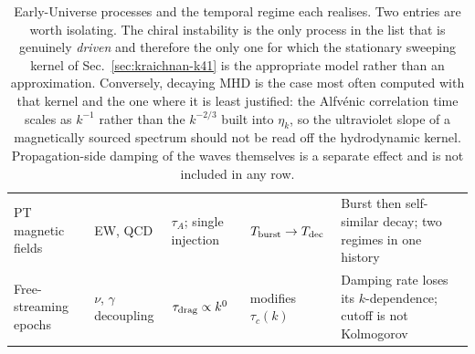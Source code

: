\documentclass[10pt,prd,aps,nobibnotes,superscriptaddress,preprintnumbers,notitlepage]{revtex4-1}
\begin{document}
\begin{table}[ht]
\begin{tabular}{@{}p{} p{} p{} p{} p{}@{}}
  PT magnetic fields \cite{Kahniashvili:2009mf} &
    EW, QCD &
    $\tau_A$; single injection &
    $T_{\rm burst}\to T_{\rm dec}$ &
    Burst then self-similar decay; two regimes in one history \\
  Free-streaming epochs \cite{Jedamzik:1996wp,Banerjee:2004df} &
    $\nu$, $\gamma$ decoupling &
    $\tau_{\rm drag}\propto k^{0}$ &
    modifies $\tau_c(k)$ &
    Damping rate loses its $k$-dependence; cutoff is not Kolmogorov \\
  \hline\hline
  \end{tabular}
  \caption{Early-Universe processes and the temporal regime each realises. Two
  entries are worth isolating. The chiral instability is the only process in the
  list that is genuinely \emph{driven} and therefore the only one for which the
  stationary sweeping kernel of Sec.~\ref{sec:kraichnan-k41} is the appropriate
  model rather than an approximation. Conversely, decaying MHD is the case most
  often computed with that kernel and the one where it is least justified: the
  Alfv\'enic correlation time scales as $k^{-1}$ rather than the $k^{-2/3}$
  built into $\eta_k$, so the ultraviolet slope of a magnetically sourced
  spectrum should not be read off the hydrodynamic kernel. Propagation-side
  damping of the waves themselves \cite{Dent:2013asa} is a separate effect and is
  not included in any row.}
  \label{tab:cosmo-relevance}
\end{table}
\end{document}
